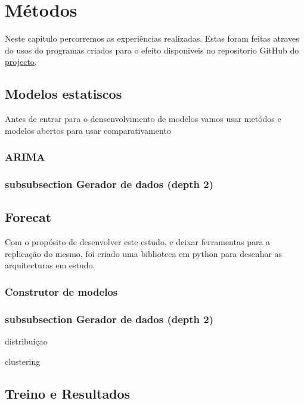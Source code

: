 \chapter{Métodos}

Neste capitulo percorremos as experiências realizadas. Estas foram feitas atraves do usos do programas criados para o efeito disponiveis no repositorio GitHub do \href{https://github.com/JotaFan/renewable-generation-into-reserve-markets}{projecto}.

\section{Modelos estatiscos  \label{se:dados_estudo}}

Antes de entrar para o densenvolvimento de modelos vamos usar metódos e modelos abertos para usar comparativamento

\subsection{ARIMA}

\subsection{subsubsection Gerador de dados (depth 2)}




\section{Forecat  \label{se:dados_estudo}}

Com o propósito de desenvolver este estudo, e deixar ferramentas para a replicação do mesmo, foi criado uma biblioteca em python para desenhar as arquitecturas em estudo.


\subsection{Construtor de modelos}


\subsection{subsubsection Gerador de dados (depth 2)}
distribuiçao

clustering


\section{Treino e Resultados  \label{se:dados_estudo}}

